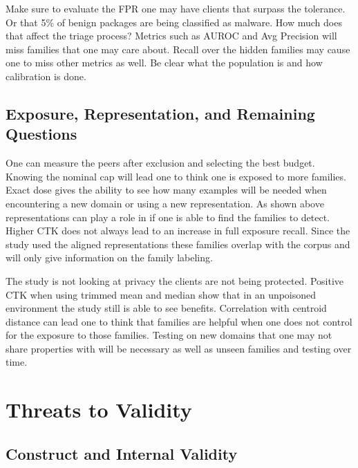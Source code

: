 \documentclass[12pt,letterpaper]{article}
\begin{document}
Make sure to evaluate the FPR one may have clients that surpass the tolerance. Or that 5\% of benign packages are being classified as malware. How much does that affect the triage process? Metrics such as AUROC and Avg Precision will miss families that one may care about. Recall over the hidden families may cause one to miss other metrics as well. Be clear what the population is and how calibration is done.

\subsection*{Exposure, Representation, and Remaining Questions} 

One can measure the peers after exclusion and selecting the best budget. Knowing the nominal cap will lead one to think one is exposed to more families. Exact dose gives the ability to see how many examples will be needed when encountering a new domain or using a new representation. As shown above representations can play a role in if one is able to find the families to detect. Higher CTK does not always lead to an increase in full exposure recall. Since the study used the aligned representations these families overlap with the corpus and will only give information on the family labeling.

The study is not looking at privacy the clients are not being protected. Positive CTK when using trimmed mean and median show that in an unpoisoned environment the study still is able to see benefits. Correlation with centroid distance can lead one to think that families are helpful when one does not control for the exposure to those families. Testing on new domains that one may not share properties with will be necessary as well as unseen families and testing over time.

\section*{Threats to Validity} 

\subsection*{Construct and Internal Validity} 
\end{document}
